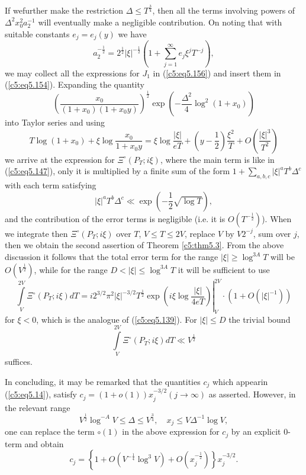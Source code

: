 If we\pageoriginale further make the restriction $\Delta \leq
T^{\frac{3}{4}}$, then all the terms involving powers of $\Delta^2
x^2_0 a^{-1}_2$ will eventually make a negligible contribution. On
noting that with suitable constants $e_j = e_j (y)$  we have 
$$ 
a^{-\frac{1}{2}}_2 = 2^{\frac{1}{2}} |\xi|^{-\frac{1}{2}} \left(1+
\sum\limits^\infty_{j=1} e_j \xi^j T^{-j} \right),  
$$
we may collect all the expressions for $J_1$ in (\ref{c5:eq5.156}) and
insert them in (\ref{c5:eq5.154}). Expanding the quantity 
$$
\left(\frac{x_0}{(1+x_0) (1+x_0 y)} \right)^{\frac{1}{2}} \exp
\left(-\frac{\Delta^2}{4} \log^2 (1+x_0) \right) 
$$
into Taylor series and using 
{\fontsize{10pt}{12pt}\selectfont
$$ 
T \log (1+x_0) + \xi \log \frac{x_0}{1+x_0y} = \xi \log
\frac{|\xi|}{eT} + \left(y-\frac{1}{2} \right) \frac{\xi^2}{T} +  O
\left(\frac{|\xi|^3}{T^2} \right) 
$$}
we arrive at the expression for $\Xi^\circ (P_T;i\xi)$, where the main
term is like in (\ref{c5:eq5.147}), only it is multiplied by a finite
sum of the form $1+\sum_{a,b,c} |\xi|^aT^b \Delta^c$ with each
term satisfying 
$$
|\xi|^{a} T^b \Delta^c \ll \exp \left(-\frac{1}{2} \sqrt{\log T} \right),
$$
and the contribution of the error terms is negligible (i.e. it is
$O(T^{-\frac{1}{2}})$). When we integrate then $\Xi^\circ (P_T;i\xi)$
over $T$, $V \leq T \leq 2V$, replace $V$ by $V2^{-j}$, sum over $j$,
then we obtain the second assertion of Theorem \ref{c5:thm5.3}. From
the above discussion it follows that the total error term for the
range $|\xi| \geq \log^{3A} T$ will be $O(V^{\frac{1}{2}})$, while for
the range $D < |\xi| \leq \log^{3A}T$ it will be sufficient to use 
{\fontsize{10pt}{12pt}\selectfont
$$
\left.
\int\limits^{2V}_V \Xi^\circ (P_T;i\xi) dT = i 2^{3/2} \pi^2
|\xi|^{-3/2} T^{\frac{1}{2}} \exp \left(i \xi \log \frac{|\xi|}{4eT}
\right) \right|^{2V}_V \cdot \left(1+O(|\xi|^{-1})\right) 
$$}
for $\xi < 0$, which is the analogue of (\ref{c5:eq5.139}). For $|\xi| 
\leq D$ the trivial bound 
$$
\int\limits^{2V}_V \Xi^\circ (P_T;i\xi) dT \ll V^{\frac{1}{2}}
$$
suffices.

In concluding, it may be remarked that the quantities $c_j$ which
appear\pageoriginale in (\ref{c5:eq5.14}), satisfy $c_j = (1+o(1))
x^{-3/2}_j (j \to \infty)$ as asserted. However, in the relevant range 
$$
V^{\frac{1}{2}} \log^{-A} V\leq \Delta \leq V^{\frac{3}{4}}, \quad x_j
\leq V\Delta^{-1} \log V, 
$$
one can replace the term $\circ(1)$ in the above expression for $c_j$
by an explicit $0$-term and obtain 
$$
c_j = \left\{1+O\left(V^{-\frac{1}{4}} \log^3 V\right) +
O\left(x^{-\frac{1}{2}}_j\right) \right\} x^{-3/2}_j. 
$$

